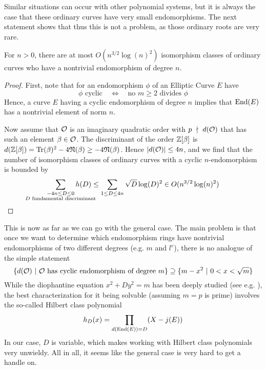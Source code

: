 Similar situations can occur with other polynomial systems, but it is always the case that these ordinary curves have very small endomorphisms.
The next statement shows that thus this is not a problem, as those ordinary roots are very rare.
\begin{prop}
    \label{prop:small_endomorphism_rare}
    For $n > 0$, there are at most $O(n^{3/2}\log(n)^2)$ isomorphism classes of ordinary curves who have a nontrivial endomorphism of degree $n$.
\end{prop}
\begin{proof}
    First, note that for an endomorphism $\phi$ of an Elliptic Curve $E$ have
    \begin{equation*}
        \text{$\phi$ cyclic} \quad \Leftrightarrow \quad \text{no $m \geq 2$ divides $\phi$}
    \end{equation*}
    Hence, a curve $E$ having a cyclic endomorphism of degree $n$ implies that $\mathrm{End}(E)$ has a nontrivial element of norm $n$.

    Now assume that $\mathcal{O}$ is an imaginary quadratic order with $p \ \nmid \  d(\mathcal{O})$ that has such an element $\beta \in \mathcal{O}$.
    The discriminant of the order $\mathbb{Z}[\beta]$ is $d(\mathbb{Z}[\beta]) = \mathrm{Tr}(\beta)^2 - 4\mathfrak{N}(\beta) \geq -4\mathfrak{N}(\beta)$.
    Hence $|d(\mathcal{O})| \leq 4n$, and we find that the number of isomorphism classes of ordinary curves with a cyclic $n$-endomorphism is bounded by
    \begin{align*}
        \sum_{\substack{-4n \leq D \leq 0\\\mathclap{\text{$D$ fundamental discriminant}}}} h(D) \leq \sum_{1 \leq D \leq 4n} \sqrt{D}\log(D)^2 \in O(n^{3/2}\log(n)^2) \qedhere
    \end{align*}
\end{proof}
This is now as far as we can go with the general case.
The main problem is that once we want to determine which endomorphism rings have nontrivial endomorphisms of two different degrees (e.g. $m$ and $l^e$), there is no analogue of the simple statement
\begin{equation*}
    \{ d(\mathcal{O}) \ | \ \text{$\mathcal{O}$ has cyclic endomorphism of degree $m$}\} \supseteq \{ m - x^2 \ | \ 0 < x < \sqrt{m} \}
\end{equation*}
While the diophantine equation $x^2 + D y^2 = m$ has been deeply studied (see e.g. \cite{cox_primes_of_form}), the best characterization for it being solvable (assuming $m = p$ is prime) involves the so-called Hilbert class polynomial
\begin{equation*}
    h_D(x) = \prod_{d(\mathrm{End}(E)) = D} (X - j(E))
\end{equation*}
In our case, $D$ is variable, which makes working with Hilbert class polynomials very unwieldy.
All in all, it seems like the general case is very hard to get a handle on.

